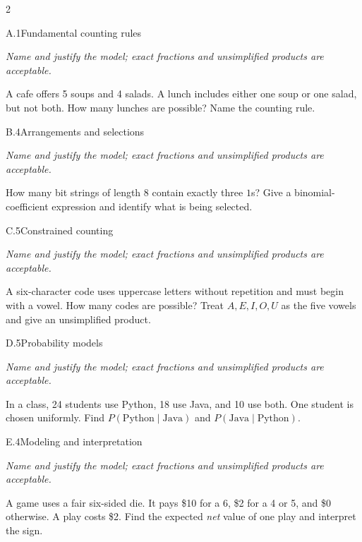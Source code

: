 \documentclass[9pt]{extarticle}
\begin{document}
\begin{multicols}{2}
\begin{CoreProblem}{A.1}{Fundamental counting rules}
{\scriptsize\textit{Name and justify the model; exact fractions and unsimplified products are acceptable.}\par}
A cafe offers 5 soups and 4 salads. A lunch includes either one soup
    or one salad, but not both. How many lunches are possible? Name the counting
    rule.
\end{CoreProblem}
\begin{CoreProblem}{B.4}{Arrangements and selections}
{\scriptsize\textit{Name and justify the model; exact fractions and unsimplified products are acceptable.}\par}
How many bit strings of length 8 contain exactly three $1$s? Give a
    binomial-coefficient expression and identify what is being selected.
\end{CoreProblem}
\begin{CoreProblem}{C.5}{Constrained counting}
{\scriptsize\textit{Name and justify the model; exact fractions and unsimplified products are acceptable.}\par}
A six-character code uses uppercase letters without repetition and
    must begin with a vowel. How many codes are possible? Treat
    $A,E,I,O,U$ as the five vowels and give an unsimplified product.
\end{CoreProblem}
\columnbreak
\begin{CoreProblem}{D.5}{Probability models}
{\scriptsize\textit{Name and justify the model; exact fractions and unsimplified products are acceptable.}\par}
In a class, 24 students use Python, 18 use Java, and 10 use both.
    One student is chosen uniformly. Find
    $P(\text{Python}\mid\text{Java})$ and
    $P(\text{Java}\mid\text{Python})$.
\end{CoreProblem}
\begin{CoreProblem}{E.4}{Modeling and interpretation}
{\scriptsize\textit{Name and justify the model; exact fractions and unsimplified products are acceptable.}\par}
A game uses a fair six-sided die. It pays \$10 for a 6, \$2 for a 4
    or 5, and \$0 otherwise. A play costs \$2. Find the expected \emph{net}
    value of one play and interpret the sign.
\end{CoreProblem}
\end{multicols}
\CoreWorkArea
\FormBreak
{}
\end{document}
